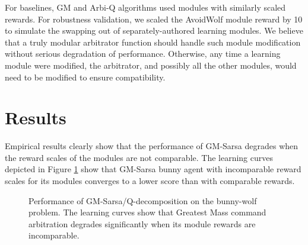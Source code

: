 For baselines, GM and Arbi-Q algorithms used modules with similarly scaled rewards. For robustness validation, we scaled the AvoidWolf module reward by 10 to simulate the swapping out of separately-authored learning modules.  We believe that a truly modular arbitrator function should handle such module modification without serious degradation of performance.  Otherwise, any time a learning module were modified, the arbitrator, and possibly all the other modules, would need to be modified to ensure compatibility.

\section{Results}

Empirical results clearly show that the performance of GM-Sarsa degrades when the reward scales of the modules are not comparable. The learning curves depicted in Figure \ref{fig:gmsarsa-results} show that GM-Sarsa bunny agent with incomparable reward scales for its modules converges to a lower score than with comparable rewards.

\begin{figure}[ht]
  \begin{center}
    \caption{Performance of GM-Sarsa/Q-decomposition on the bunny-wolf problem. The learning curves show that Greatest Mass command arbitration degrades significantly when its module rewards are incomparable.}
  \end{center}
  \label{fig:gmsarsa-results}
\end{figure}

